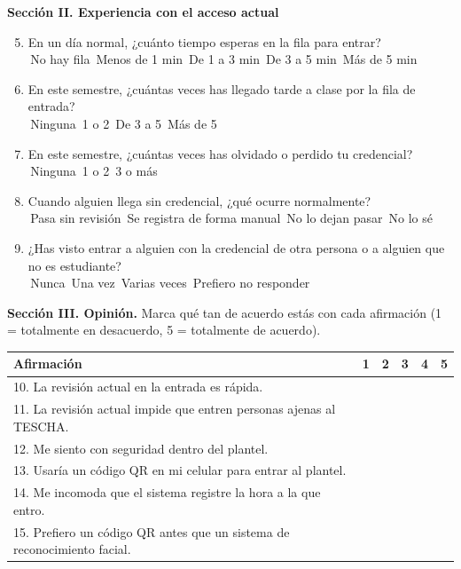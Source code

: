 \documentclass[stu,11pt,floatsintext,biblatex]{apa7}
\newcommand{\op}{\framebox[0.8em]{\rule{0pt}{0.55em}}\,}
\begin{document}
\noindent\textbf{Sección II. Experiencia con el acceso actual}
\begin{enumerate}\setcounter{enumi}{4}
  \item En un día normal, ¿cuánto tiempo esperas en la fila para entrar?\\
  \op No hay fila \quad \op Menos de 1 min \quad \op De 1 a 3 min
  \quad \op De 3 a 5 min \quad \op Más de 5 min
  \item En este semestre, ¿cuántas veces has llegado tarde a clase por la fila
  de entrada?\\
  \op Ninguna \quad \op 1 o 2 \quad \op De 3 a 5 \quad \op Más de 5
  \item En este semestre, ¿cuántas veces has olvidado o perdido tu credencial?\\
  \op Ninguna \quad \op 1 o 2 \quad \op 3 o más
  \item Cuando alguien llega sin credencial, ¿qué ocurre normalmente?\\
  \op Pasa sin revisión \quad \op Se registra de forma manual
  \quad \op No lo dejan pasar \quad \op No lo sé
  \item ¿Has visto entrar a alguien con la credencial de otra persona o a
  alguien que no es estudiante?\\
  \op Nunca \quad \op Una vez \quad \op Varias veces
  \quad \op Prefiero no responder
\end{enumerate}

\noindent\textbf{Sección III. Opinión.} Marca qué tan de acuerdo estás con cada
afirmación (1 = totalmente en desacuerdo, 5 = totalmente de acuerdo).

\medskip
\noindent
\begin{tabular}{p{}ccccc}
  \toprule
  Afirmación & 1 & 2 & 3 & 4 & 5 \\
  \midrule
  10. La revisión actual en la entrada es rápida. & \op & \op & \op & \op & \op \\
  11. La revisión actual impide que entren personas ajenas al TESCHA. & \op & \op & \op & \op & \op \\
  12. Me siento con seguridad dentro del plantel. & \op & \op & \op & \op & \op \\
  13. Usaría un código QR en mi celular para entrar al plantel. & \op & \op & \op & \op & \op \\
  14. Me incomoda que el sistema registre la hora a la que entro. & \op & \op & \op & \op & \op \\
  15. Prefiero un código QR antes que un sistema de reconocimiento facial. & \op & \op & \op & \op & \op \\
  \bottomrule
\end{tabular}
\end{document}
